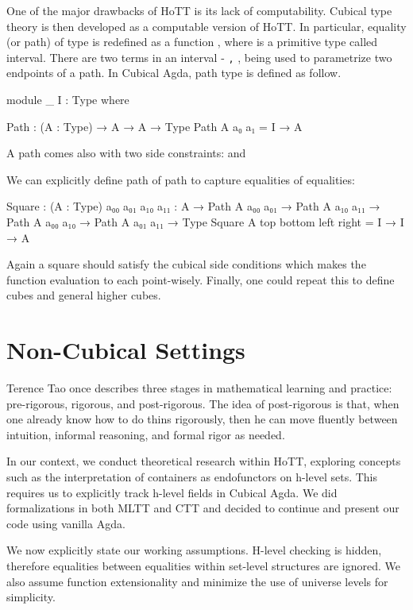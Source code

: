 One of the major drawbacks of HoTT is its lack of computability. Cubical type theory is then developed as a computable version of HoTT. In particular, equality (or path) of type  is redefined as a function   , where  is a primitive type called interval. There are two terms in an interval -  \texttt{,}  \AgdaSymbol{:} , being used to parametrize two endpoints of a path. In Cubical Agda, path type is defined as follow.

\begin{code}[hide]
module _ {I : Type} where
\end{code}

\begin{code}
  Path : (A : Type) → A  → A → Type
  Path A a₀ a₁ = I → A
\end{code}

A path  comes also with two side constraints: \AgdaSymbol{= } and \AgdaSymbol{= }

We can explicitly define path of path to capture equalities of equalities:

\begin{code}
  Square : (A : Type) {a₀₀ a₀₁ a₁₀ a₁₁ : A} 
    → Path A a₀₀ a₀₁ → Path A a₁₀ a₁₁ 
    → Path A a₀₀ a₁₀ → Path A a₀₁ a₁₁
    → Type
  Square A top bottom left right = I → I → A
\end{code}

Again a square  should satisfy the cubical side conditions which makes the function evaluation to each  point-wisely. Finally, one could repeat this to define cubes and general higher cubes.

\section{Non-Cubical Settings}

Terence Tao once describes three stages in mathematical learning and practice: pre-rigorous, rigorous, and post-rigorous. The idea of post-rigorous is that, when one already know how to do thins rigorously, then he can move fluently between intuition, informal reasoning, and formal rigor as needed.

In our context, we conduct theoretical research within HoTT, exploring concepts such as the interpretation of containers as endofunctors on h-level sets. This requires us to explicitly track h-level fields in Cubical Agda. We did formalizations in both MLTT and CTT and decided to continue and present our code using vanilla Agda.

We now explicitly state our working assumptions. H-level checking is hidden, therefore equalities between equalities within set-level structures are ignored. We also assume function extensionality and minimize the use of universe levels for simplicity.